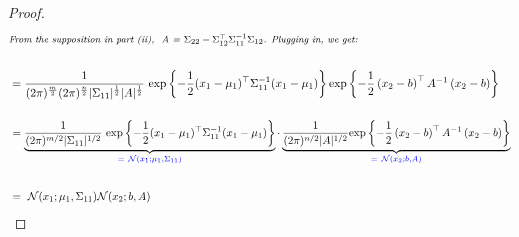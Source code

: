 \documentclass[twoside,11pt]{homework}
\DeclarePairedDelimiter{\2norm}{\lVert}{\rVert^2_2}
\newcommand{\1}[1]{\mathds{1}\left[#1\right]}
\begin{document}
\begin{proof}
\begin{align*}
\intertext{\footnotesize \textit{From the supposition in part (ii), \ A = $\Sigma_{22} - \Sigma_{12}^{\top}\Sigma_{11}^{-1}\Sigma_{12}$. Plugging in, we get:}} \\
& = \frac{1}{(2\pi)^{\frac{m}{2}}(2\pi)^{\frac{n}{2}}|\Sigma_{11}|^{\frac{1}{2}}|A|^{\frac{1}{2}}} \ \text{exp} \left\lbrace -\frac{1}{2}(x_1 - \mu_1)^{\top}\Sigma_{11}^{-1}(x_1-\mu_1) \right\rbrace \text{exp} \left\lbrace -\frac{1}{2}\left(x_2 - b \right)^{\top} A^{-1} \left(x_2 - b \right) \right\rbrace \\[1em]
\end{align*}
\begin{align*}
& = \underbrace{\frac{1}{(2\pi)^{m/2}|\Sigma_{11}|^{1/2}} \ \text{exp} \left\lbrace -\frac{1}{2}(x_1 - \mu_1)^{\top}\Sigma_{11}^{-1}(x_1-\mu_1) \right\rbrace}_{\color{blue} = \ \mathcal{N}(x_1; \mu_1, \Sigma_{11})} \cdot \underbrace{ \frac{1}{(2\pi)^{n/2}|A|^{1/2}} \text{exp} \left\lbrace -\frac{1}{2}\left(x_2 - b \right)^{\top} A^{-1} \left(x_2 - b \right) \right\rbrace}_{\color{blue} = \ \mathcal{N}(x_2; b, A)} \\[2em]
& = \ \mathcal{N}(x_1; \mu_1, \Sigma_{11})\mathcal{N}(x_2; b, A)
\end{align*}
\end{proof}
\end{document}
